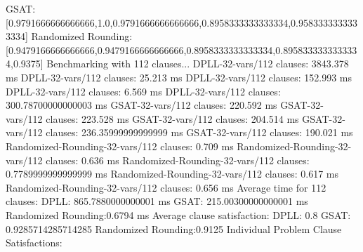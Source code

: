 \documentclass{article}
\begin{document}
  GSAT:               [0.9791666666666666,1.0,0.9791666666666666,0.8958333333333334,0.9583333333333334]\newline
  Randomized Rounding:[0.9479166666666666,0.9479166666666666,0.8958333333333334,0.8958333333333334,0.9375]\newline
\newline
\newline
Benchmarking with 112 clauses...\newline
DPLL-32-vars/112 clauses: 3843.378 ms\newline
DPLL-32-vars/112 clauses: 25.213 ms\newline
DPLL-32-vars/112 clauses: 152.993 ms\newline
DPLL-32-vars/112 clauses: 6.569 ms\newline
DPLL-32-vars/112 clauses: 300.78700000000003 ms\newline
GSAT-32-vars/112 clauses: 220.592 ms\newline
GSAT-32-vars/112 clauses: 223.528 ms\newline
GSAT-32-vars/112 clauses: 204.514 ms\newline
GSAT-32-vars/112 clauses: 236.35999999999999 ms\newline
GSAT-32-vars/112 clauses: 190.021 ms\newline
Randomized-Rounding-32-vars/112 clauses: 0.709 ms\newline
Randomized-Rounding-32-vars/112 clauses: 0.636 ms\newline
Randomized-Rounding-32-vars/112 clauses: 0.7789999999999999 ms\newline
Randomized-Rounding-32-vars/112 clauses: 0.617 ms\newline
Randomized-Rounding-32-vars/112 clauses: 0.656 ms\newline
Average time for 112 clauses:\newline
  DPLL:               865.7880000000001 ms\newline
  GSAT:               215.00300000000001 ms\newline
  Randomized Rounding:0.6794 ms\newline
Average clause satisfaction:\newline
  DPLL:               0.8\newline
  GSAT:               0.9285714285714285\newline
  Randomized Rounding:0.9125\newline
\newline
Individual Problem Clause Satisfactions:\newline
\end{document}
